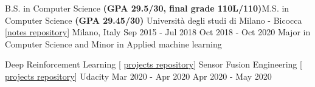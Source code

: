 

\begin{cventries}

  \cventry
    {B.S. in Computer Science \textbf{(GPA 29.5/30, final grade 110L/110)}\linebreak M.S. in Computer Science \textbf{(GPA 29.45/30)}  } %
    {Università degli studi di Milano - Bicocca  {\tiny [\href{https://github.com/gianscarpe/unimib}{notes repository}]} } %
    {Milano, Italy} %
    {Sep 2015 - Jul 2018 \linebreak Oct 2018 - Oct 2020} %
    {Major in Computer Science and Minor in Applied machine learning
    }

  \cventry
{Deep Reinforcement Learning {\tiny [ \href{https://github.com/gianscarpe/udacity_deep_reinforcement_learning}{projects repository}]} 	
\linebreak
Sensor Fusion Engineering {\tiny [ \href{https://github.com/gianscarpe/udacity_sensor_fusion}{projects repository}]}
} %
{Udacity} %
{} %
{Mar 2020 - Apr 2020 \linebreak Apr 2020 - May 2020} %
{
}
\vspace{-0.7cm}
\end{cventries}
